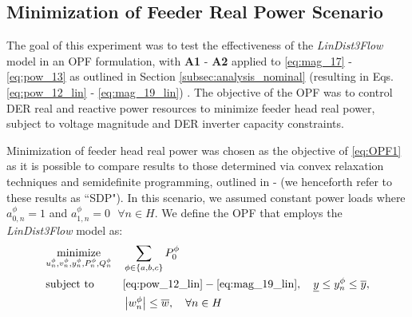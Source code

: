 \subsection{Minimization of Feeder Real Power Scenario}

The goal of this experiment was to test the effectiveness of the \emph{LinDist3Flow} model in an OPF formulation, with \textbf{A1} - \textbf{A2} applied to \eqref{eq:mag_17} - \eqref{eq:pow_13} as outlined in Section \ref{subsec:analysis_nominal} (resulting in Eqs. \eqref{eq:pow_12_lin} - \eqref{eq:mag_19_lin}) .  The objective of the OPF was to control DER real and reactive power resources to minimize feeder head real power, subject to voltage magnitude and DER inverter capacity constraints.

Minimization of feeder head real power was chosen as the objective of \eqref{eq:OPF1} as it is possible to compare results to those determined via convex relaxation techniques and semidefinite programming, outlined in \cite{dall2012optimization} - \cite{dall2013distributed} (we henceforth refer to these results as ``SDP").  In this scenario, we assumed constant power loads where $a_{0,n}^{\phi} = 1$ and $a_{1,n}^{\phi} = 0 \text{ } \forall n \in H$. We define the OPF that employs the \textit{LinDist3Flow} model as:
\begin{equation}
\begin{aligned}
	& \underset{u_{n}^{\phi},v_{n}^{\phi},y_{n}^{\phi},P_{n}^{\phi},Q_{n}^{\phi}} {\text{minimize}} & & \sum_{\phi \in \{ a,b,c\}} P_{0}^{\phi} \\
    & \text{subject to} & & \eqref{eq:pow_12_lin} - \eqref{eq:mag_19_lin}, \quad \underline{y} \le y_{n}^{\phi} \le \overline{y}, \\
    & & & \left| w_{n}^{\phi} \right| \le \overline{w}, \quad \forall n \in H
\end{aligned}
\label{eq:OPF1}
\end{equation}


